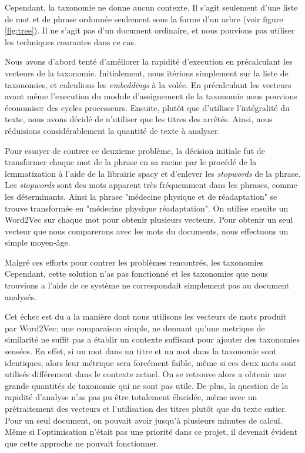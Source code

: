Cependant, la taxonomie ne donne aucun contexte. Il s'agit seulement d'une liste de mot et de phrase ordonnée seulement sous la forme d'un arbre (voir figure \ref{fig:tree}). Il ne s'agit pas d'un document ordinaire, et nous pouvions pas utiliser les techniques courantes dans ce cas. 

Nous avons d'abord tenté d'améliorer la rapidité d'execution en précalculant les vecteurs de la taxonomie. Initialement, nous itérions simplement sur la liste de taxonomies, et calculions les \textit{embeddings} à la volée. En précalculant les vecteurs avant même l'execution du module d'assignement de la taxonomie nous pouvions économiser des cycles processeurs. Ensuite, plutôt que d'utiliser l'intégralité du texte, nous avons décidé de n'utiliser que les titres des arrêtés. Ainsi, nous réduisions considérablement la quantité de texte à analyser.

Pour essayer de contrer ce deuxieme problème, la décision initiale fut de transformer chaque mot de la phrase en sa racine par le procédé de la lemmatization à l'aide de la librairie spacy\cite{spacy} et d'enlever les \textit{stopwords} de la phrase.
Les \textit{stopwords} sont des mots apparent très fréquemment dans les phrases, comme les déterminants.
Ainsi la phrase "médecine physique et de réadaptation" se trouve transformée en "médecine physique réadaptation".
On utilise ensuite un Word2Vec sur chaque mot pour obtenir plusieurs vecteurs. Pour obtenir un seul vecteur que nous comparerons avec les mots du documents, nous effectuons un simple moyen-âge.

Malgré ces efforts pour contrer les problèmes rencontrés, les taxonomies
Cependant, cette solution n'as pas fonctionné et les taxonomies que nous trouvions a l'aide de ce système ne correspondait simplement pas au document analysés.

Cet échec est du a la manière dont nous utilisons les vecteurs de mots produit par Word2Vec: une comparaison simple, ne donnant qu'une metrique de similarité ne suffit pas a établir un contexte suffisant pour ajouter des taxonomies sensées. En effet, si un mot dans un titre et un mot dans la taxonomie sont identiques, alors leur métrique sera forcément faible, même si ces deux mots sont utilisés différement dans le contexte actuel. On se retrouve alors a obtenir une grande quantités de taxonomie qui ne sont pas utile. De plus, la question de la rapidité d'analyse n'as pas pu être totalement élucidée, même avec un prétraitement des vecteurs et l'utilisation des titres plutôt que du texte entier. Pour un seul document, on pouvait avoir jusqu'à plusieurs minutes de calcul. Même si l'optimisation n'était pas une priorité dans ce projet, il devenait évident que cette approche ne pouvait fonctionner.

